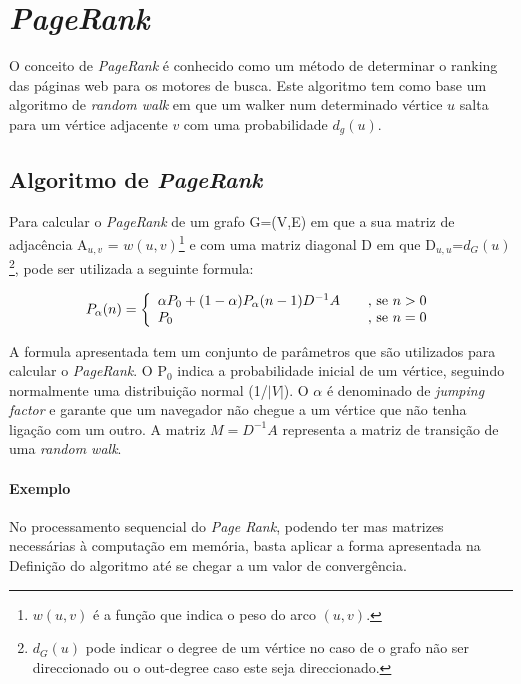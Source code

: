 
\section{\textit{PageRank}}

  \label{sec:dpr}

  O conceito de \textit{PageRank} é conhecido como um método de determinar o ranking das páginas web para os motores de busca. 
  Este algoritmo tem como base um algoritmo de \textit{random walk} em que um walker num determinado vértice $u$ salta para um vértice adjacente $v$ com uma probabilidade $d_g(u)$.
  
  \subsection{Algoritmo de \textit{PageRank}}
  Para calcular o \textit{PageRank} de um grafo G=(V,E) em que a sua matriz de adjacência A$_{u,v}$ = $w(u,v)$\footnote{$w(u,v)$ é a função que indica o peso do arco $(u,v)$.} e com uma matriz diagonal D em que D$_{u,u}$=$d_G(u)$\footnote{$d_G(u)$ pode indicar o degree de um vértice no caso de o grafo não ser direccionado ou o out-degree caso este seja direccionado.}, pode ser utilizada a seguinte formula:
  
\[ P_\alpha(n) = \left\{
  \begin{array}{l l}
    \alpha P_0+(1-\alpha)P_\alpha(n-1)D^{{-}1}A & \quad \text{, se } n>0   \\
    P_0 & \quad \text{, se }n=0 
  \end{array} \right.\]
  
  A formula apresentada tem um conjunto de parâmetros que são utilizados para calcular o \textit{PageRank}. O P$_0$ indica a probabilidade inicial de um vértice, seguindo normalmente uma distribuição normal (1/$|V|$). O $\alpha$ é denominado de \textit{jumping factor} e garante que um navegador não chegue a um vértice que não tenha ligação com um outro. A matriz $M=D^{{-}1}A$ representa a matriz de transição de uma \textit{random walk}.
  
  \paragraph{Exemplo}  
  No processamento sequencial do \textit{Page Rank}, podendo ter mas matrizes necessárias à computação em memória, basta aplicar a forma apresentada na Definição do algoritmo até se chegar a um valor de convergência.
   
